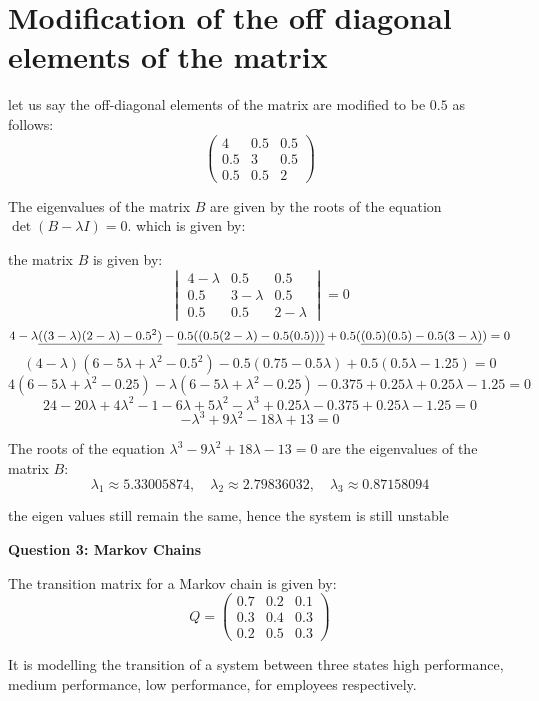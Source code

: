 \documentclass{article}
\begin{document}
\section{Modification of the off diagonal elements of the matrix}

let us say the off-diagonal elements of the matrix are modified to be \(0.5\) as follows:
\[\begin{pmatrix}
4 & 0.5 & 0.5 \\
0.5 & 3 & 0.5 \\
0.5 & 0.5 & 2
\end{pmatrix}\]

The eigenvalues of the matrix \(B\) are given by the roots of the equation \(\det(B - \lambda I) = 0\). which is given by:

the matrix \(B\) is given by:
\[\begin{vmatrix}
4-\lambda & 0.5 & 0.5 \\
0.5 & 3-\lambda & 0.5 \\
0.5 & 0.5 & 2-\lambda
\end{vmatrix} = 0\]
\[4-\lambda\uline{((3-\lambda)(2-\lambda) - 0.5^2)} - \uline{0.5((0.5(2-\lambda) - 0.5(0.5)))} + 0.5(\uline{(0.5)(0.5)-0.5(3-\lambda)}) = 0\]
\[(4-\lambda)(6 - 5\lambda + \lambda^2 - 0.5^2) - 0.5(0.75-0.5\lambda) + 0.5(0.5\lambda -1.25) = 0\]
\[4(6 - 5\lambda + \lambda^2 - 0.25) -\lambda(6-5\lambda + \lambda^2 - 0.25) - 0.375 + 0.25\lambda + 0.25\lambda - 1.25 = 0\]
\[24 - 20\lambda + 4\lambda^2 - 1 - 6\lambda + 5\lambda^2 - \lambda^3 + 0.25\lambda - 0.375 + 0.25\lambda - 1.25 = 0\]
\[-\lambda^3 + 9\lambda^2 - 18\lambda + 13 = 0\]

The roots of the equation \(\lambda^3 - 9\lambda^2 + 18\lambda - 13 = 0\) are the eigenvalues of the matrix \(B\):
\[\lambda_1 \approx 5.33005874, \quad \lambda_2 \approx 2.79836032, \quad \lambda_3 \approx 0.87158094\]

the eigen values still remain the same, hence the system is still unstable

\begin{center}
    \large \textbf{Question 3: Markov Chains}
\end{center}

The transition matrix for a Markov chain is given by:
\[Q=\begin{pmatrix}
0.7 & 0.2 & 0.1 \\
0.3 & 0.4 & 0.3 \\
0.2 & 0.5 & 0.3
\end{pmatrix}\]

It is modelling the transition of a system between three states high performance, medium performance, low performance, for employees respectively.
\end{document}
